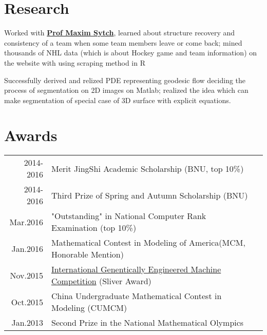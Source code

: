 \documentclass[letterpaper]{deedy-resume} %
\begin{document}
\begin{minipage}[t]{0.66\textwidth}
\section{Research}


Worked with \textbf{\href{https://michiganross.umich.edu/faculty-research/faculty/maxim-sytch}{Prof Maxim Sytch}}, learned about structure recovery and consistency of a team when some team members leave or come back; mined thousands of NHL data (which is about Hockey game and team information) on the website with using scraping method in R

\sectionspace %



Successfully derived and relized PDE representing geodesic flow deciding the process of segmentation on 2D images on Matlab; realized the idea which can make segmentation of special case of 3D surface with explicit equations.

\sectionspace %


\section{Awards} 

\begin{tabular}{rll}
2014-2016 & Merit JingShi Academic Scholarship (BNU, top 10\%)\\
2014-2016 & Third Prize of Spring and Autumn Scholarship (BNU)\\
Mar.2016 & "Outstanding" in National Computer Rank Examination (top 10\%)\\
Jan.2016 & Mathematical Contest in Modeling of America(MCM, Honorable Mention)\\
Nov.2015 & \href{http://2015.igem.org/Team:BNU-CHINA/Team}{International Genentically Engineered Machine Competition} (Sliver Award)\\
Oct.2015 & China Undergraduate Mathematical Contest in Modeling (CUMCM)\\
Jan.2013 & Second Prize in the National Mathematical Olympics\\
\end{tabular}


\end{minipage}
\end{document}
